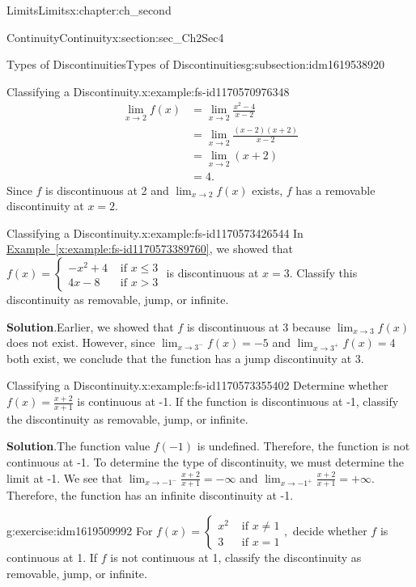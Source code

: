 \documentclass[oneside,10pt,]{book}
\newcommand{\blocktitlefont}{\relax}
\newcommand{\xreffont}{\relax}
\numberwithin{equation}{section}
\newcommand{\gt}{>}
\newcommand{\amp}{&}
\begin{document}
\begin{chapterptx}{Limits}{}{Limits}{}{}{x:chapter:ch_second}
\begin{sectionptx}{Continuity}{}{Continuity}{}{}{x:section:sec_Ch2Sec4}
\begin{subsectionptx}{Types of Discontinuities}{}{Types of Discontinuities}{}{}{g:subsection:idm1619538920}
\begin{example}{Classifying a Discontinuity.}{x:example:fs-id1170570976348}
%
\begin{align*}
\lim_{x\to 2}f(x)\amp=\lim_{x\to 2}\frac{x^2-4}{x-2}\\
\amp=\lim_{x\to 2}\frac{(x-2)(x+2)}{x-2}\\
\amp=\lim_{x\to 2}(x+2)\\
\amp=4.
\end{align*}
Since \(f\) is discontinuous at 2 and \(\lim_{x\to 2}f(x)\) exists, \(f\) has a removable discontinuity at \(x=2.\)%
\end{example}
\begin{example}{Classifying a Discontinuity.}{x:example:fs-id1170573426544}%
In \hyperref[x:example:fs-id1170573389760]{Example~{\xreffont\ref{x:example:fs-id1170573389760}}}, we showed that \(f(x)=\begin{cases}-x^2+4\amp\text{ if } x\leq  3\\4x-8\amp\text{ if } x\gt 3\end{cases}\) is discontinuous at \(x=3.\) Classify this discontinuity as removable, jump, or infinite.%
\par\smallskip%
\noindent\textbf{\blocktitlefont Solution}.\hypertarget{g:solution:idm1619514472}{}\quad{}Earlier, we showed that \(f\) is discontinuous at 3 because \(\lim_{x\to 3}f(x)\) does not exist. However, since \(\lim_{x\to  3^-}f(x)=-5\) and \(\lim_{x\to  3^+}f(x)=4\) both exist, we conclude that the function has a jump discontinuity at 3.%
\end{example}
\begin{example}{Classifying a Discontinuity.}{x:example:fs-id1170573355402}%
Determine whether \(f(x)=\frac{x+2}{x+1}\) is continuous at -1. If the function is discontinuous at -1, classify the discontinuity as removable, jump, or infinite.%
\par\smallskip%
\noindent\textbf{\blocktitlefont Solution}.\hypertarget{g:solution:idm1619509096}{}\quad{}The function value \(f(-1)\) is undefined. Therefore, the function is not continuous at -1. To determine the type of discontinuity, we must determine the limit at -1. We see that \(\lim_{x\to  -1^-}\frac{x+2}{x+1}=-\infty \) and \(\lim_{x\to  -1^+}\frac{x+2}{x+1}=+\infty .\) Therefore, the function has an infinite discontinuity at -1.%
\end{example}
\begin{inlineexercise}{}{g:exercise:idm1619509992}%
For \(f(x)=\begin{cases}x^2\amp\text{ if } x\neq 1\\3\amp\text{ if } x=1 \end{cases},\) decide whether \(f\) is continuous at 1. If \(f\) is not continuous at 1, classify the discontinuity as removable, jump, or infinite.%

\end{inlineexercise}
\end{subsectionptx}
\end{sectionptx}
\end{chapterptx}
\end{document}

